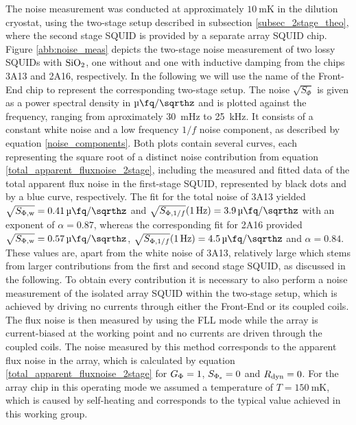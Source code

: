 The noise measurement was conducted at approximately $\qty{10}{\milli\kelvin}$ in the dilution cryostat, using the two-stage setup described in subsection \ref{subsec_2stage_theo}, where the second stage SQUID is provided by a separate array SQUID chip. Figure \ref{abb:noise_meas} depicts the two-stage noise measurement of two lossy SQUIDs with ${\rm SiO_2}$, one without and one with inductive damping from the chips 3A13 and 2A16, respectively. In the following we will use the name of the Front-End chip to represent the corresponding two-stage setup. The noise $\sqrt{S_\Phi}$ is given as a power spectral density in $\unit{\micro\fq\per\sqrthz}$
and is plotted against the frequency, ranging from   aproximately \qty{30}{\milli\hertz} to \qty{25}{\kHz}. It consists of a constant white noise and a low frequency $1/f$ noise component, as described by equation \ref{noise_components}. Both plots contain several curves, each representing the square root of a distinct noise contribution from equation \ref{total_apparent_fluxnoise_2stage}, including the measured and fitted data of the total apparent flux noise in the first-stage SQUID, represented by black dots and by a blue curve, respectively. The fit for the total noise of 3A13 yielded $\sqrt{S_{\rm \Phi,w}}=\qty{0.41}{\micro\fq\per\sqrthz}$ and $\sqrt{S_{{\rm \Phi},1/f}}(\qty{1}{\Hz})=\qty{3.9}{\micro\fq\per\sqrthz}$ with an exponent of $\alpha=0.87$, whereas the corresponding fit for 2A16 provided $\sqrt{S_{\rm \Phi,w}}=\qty{0.57}{\micro\fq\per\sqrthz}$, $\sqrt{S_{{\rm \Phi},1/f}}(\qty{1}{\Hz})=\qty{4.5}{\micro\fq\per\sqrthz}$ and $\alpha=0.84$. These values are, apart from the white noise of 3A13, relatively large which stems from larger contributions from the first and second stage SQUID, as discussed in the following. To obtain every contribution it is necessary to also perform a noise measurement of the isolated array SQUID within the two-stage setup, which is achieved by driving no currents through either the Front-End or its coupled coils. The flux noise is then measured by using the FLL mode while the array is current-biased at the working point and no currents are driven through the coupled coils. The noise measured by this method corresponds to the apparent flux noise in the array, which is calculated by equation  \ref{total_apparent_fluxnoise_2stage} for $G_{\rm \Phi}=1$, $S_{\rm \Phi_s}=0$ and $R_{\rm dyn}=0$. For the array chip in this operating mode we assumed a temperature of $T=\qty{150}{\milli\kelvin}$, which is caused by self-heating and corresponds to the typical value achieved in this working group.
